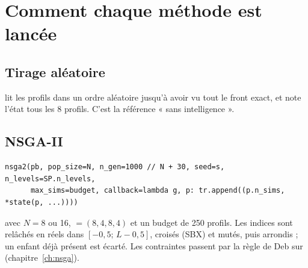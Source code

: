 \section{Comment chaque méthode est lancée}
\subsection{Tirage aléatoire}
 lit les profils dans un ordre aléatoire jusqu'à avoir vu tout le front exact, et note l'état tous les 8 profils. C'est la référence « sans intelligence ».

\subsection{NSGA-II}
\begin{lstlisting}
nsga2(pb, pop_size=N, n_gen=1000 // N + 30, seed=s, n_levels=SP.n_levels,
      max_sims=budget, callback=lambda g, p: tr.append((p.n_sims, *state(p, ...))))
\end{lstlisting}
avec $N=8$ ou 16, $=(8,4,8,4)$ et un budget de 250 profils. Les indices sont relâchés en réels dans $[-0{,}5;\,L-0{,}5]$, croisés (SBX) et mutés, puis arrondis ; un enfant déjà présent est écarté. Les contraintes passent par la règle de Deb sur  (chapitre~\ref{ch:nsga}).

